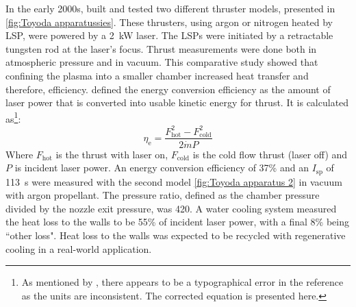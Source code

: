 
        In the early 2000s, \textcite{toyodaThrustPerformanceCW2002} built and tested two different thruster models, presented in \autoref{fig:Toyoda apparatussies}. These thrusters, using argon or nitrogen heated by LSP, were powered by a \qty{2}{kW}  laser. The LSPs were initiated by a retractable tungsten rod at the laser's focus. Thrust measurements were done both in atmospheric pressure and in vacuum. This comparative study showed that confining the plasma into a smaller chamber increased heat transfer and therefore, efficiency. \textcite{toyodaThrustPerformanceCW2002} defined the energy conversion efficiency as the amount of laser power that is converted into usable kinetic energy for thrust. It is calculated as\footnote{As mentioned by \textcite{duplayArgonLaserPlasmaThruster2024a}, there appears to be a typographical error in the reference as the units are inconsistent. The corrected equation is presented here.}:
        \[ \eta_\mathrm{e} =  \frac{F^2_\mathrm{hot} -F^2_\mathrm{cold}}{2 \dot{m} P}\]
        Where $F_\mathrm{hot}$ is the thrust with laser on, $F_\mathrm{cold}$ is the cold flow thrust (laser off) and $P$ is incident laser power. An energy conversion efficiency of 37\% and an $I_\mathrm{sp}$ of \qty{113}{s} were measured with the second model \autoref{fig:Toyoda apparatus 2} in vacuum with argon propellant. The pressure ratio, defined as the chamber pressure divided by the nozzle exit pressure, was 420. A water cooling system measured the heat loss to the walls to be 55\% of incident laser power, with a final 8\% being ``other loss". Heat loss to the walls was expected to be recycled with regenerative cooling in a real-world application.

